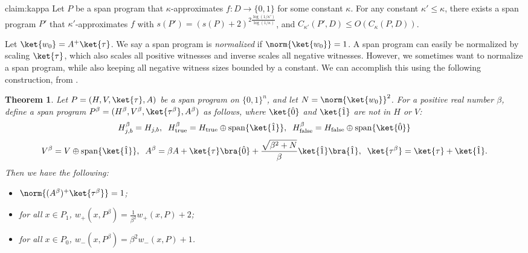 \documentclass[11pt]{article}
\numberwithin{equation}{section}
\newtheorem{theorem}{Theorem}[section]
\theoremstyle{definition}
\theoremstyle{plain}
\begin{document}
\begin{repclaim}{claim:kappa}
Let $P$ be a span program that $\kappa$-approximates $f:D\rightarrow\{0,1\}$ for some constant $\kappa$. For any constant $\kappa'\leq \kappa$, there exists a span program $P'$ that $\kappa'$-approximates $f$ with $s(P')=(s(P)+2)^{2\frac{\log(1/\kappa')}{\log(1/\kappa)}}$, and $C_{\kappa'}(P',D)\leq O\left(C_\kappa(P,D)\right)$. 
\end{repclaim}


Let $\ket{w_0}=A^+\ket{\tau}$. We say a span program is \emph{normalized} if $\norm{\ket{w_0}}=1$. A span program can easily be normalized by scaling $\ket{\tau}$, which also scales all positive witnesses and inverse scales all negative witnesses. However, we sometimes want to normalize a span program, while also keeping all negative witness sizes bounded by a constant. We can accomplish this using the following construction, from \cite{IJ15}. 

\begin{theorem}\label{thm:scaling}
Let $P=(H,V,\ket{\tau},A)$ be a span program on $\{0,1\}^n$, and let $N=\norm{\ket{w_0}}^2$. For a positive real number $\beta$, define a span program $P^{\beta}=(H^\beta,V^\beta,\ket{\tau^\beta},A^\beta)$ as follows, where $\ket{\hat{0}}$ and $\ket{\hat{1}}$ are not in $H$ or $V$:
$$H_{j,b}^\beta = H_{j,b}, \;\; H_{\mathrm{true}}^\beta=H_{\mathrm{true}}\oplus \mathrm{span}\{\ket{\hat{1}}\},
\;\; H_{\mathrm{false}}^\beta=H_{\mathrm{false}}\oplus \mathrm{span}\{\ket{\hat{0}}\}$$
$$V^\beta = V\oplus \mathrm{span}\{\ket{\hat{1}}\},\;\; A^\beta = \beta A + \ket{\tau}\bra{\hat{0}}+\frac{\sqrt{\beta^2+N}}{\beta}\ket{\hat{1}}\bra{\hat{1}}, \;\; \ket{\tau^\beta} = \ket{\tau}+\ket{\hat{1}}.$$
Then we have the following:
\begin{itemize}
\item $\norm{(A^\beta)^+\ket{\tau^\beta}}=1$;
\item for all $x\in P_1$, ${w}_+(x,P^\beta)=\frac{1}{\beta^2}w_+(x,P)+2$;
\item for all $x\in P_0$, $w_-(x,P^\beta)=\beta^2 w_-(x,P)+1$.
\end{itemize}
\end{theorem}
\end{document}
